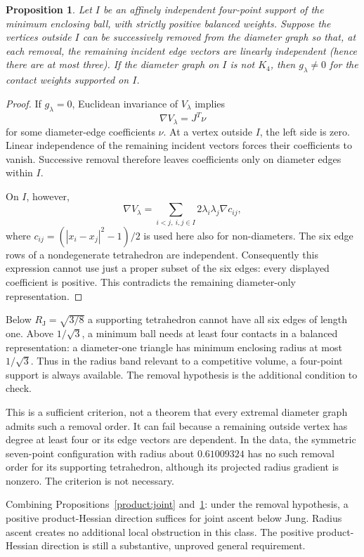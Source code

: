 \documentclass[11pt]{article}
\newtheorem{proposition}[theorem]{Proposition}
\theoremstyle{remark}\newtheorem{remark}[theorem]{Remark}
\newcommand{\RJ}{R_{\mathrm J}}
\begin{document}
\begin{proposition}\label{product:peel}
Let $I$ be an affinely independent four-point support of the minimum
enclosing ball, with strictly positive balanced weights. Suppose the
vertices outside $I$ can be successively removed from the diameter graph
so that, at each removal, the remaining incident edge vectors are
linearly independent (hence there are at most three).
If the diameter graph on $I$ is not $K_4$, then $g_\lambda\ne0$ for
the contact weights supported on $I$.
\end{proposition}
\begin{proof}
If $g_\lambda=0$, Euclidean invariance of $V_\lambda$ implies
\[
 \nabla V_\lambda=J^T\nu
\]
for some diameter-edge coefficients $\nu$. At a vertex outside $I$,
the left side is zero. Linear independence of the remaining incident
vectors forces their coefficients to vanish. Successive removal
therefore leaves coefficients only on diameter edges within $I$.

On $I$, however,
\[
 \nabla V_\lambda=
 \sum_{i<j,\ i,j\in I}2\lambda_i\lambda_j\nabla c_{ij},
\]
where $c_{ij}=(|x_i-x_j|^2-1)/2$ is used here also for non-diameters.
The six edge rows of a nondegenerate tetrahedron are independent.
Consequently this expression cannot use just a proper subset of the
six edges: every displayed coefficient is positive. This contradicts
the remaining diameter-only representation.
\end{proof}

Below $\RJ=\sqrt{3/8}$ a supporting tetrahedron cannot have all six
edges of length one. Above $1/\sqrt3$, a minimum ball needs at least
four contacts in a balanced representation: a diameter-one triangle
has minimum enclosing radius at most $1/\sqrt3$. Thus in the radius
band relevant to a competitive volume, a four-point support is always
available. The removal hypothesis is the additional condition to check.

This is a sufficient criterion, not a theorem that every extremal
diameter graph admits such a removal order. It can fail because a
remaining outside vertex has degree at least four or its edge vectors
are dependent. In the data, the symmetric seven-point configuration
with radius about $0.61009324$ has no such removal order for its
supporting tetrahedron, although its projected radius gradient is
nonzero. The criterion is not necessary.

Combining Propositions~\ref{product:joint} and~\ref{product:peel}: under the removal
hypothesis, a positive product-Hessian direction suffices for joint
ascent below Jung. Radius ascent creates no additional local obstruction
in this class. The positive product-Hessian direction is still a
substantive, unproved general requirement.
\end{document}
